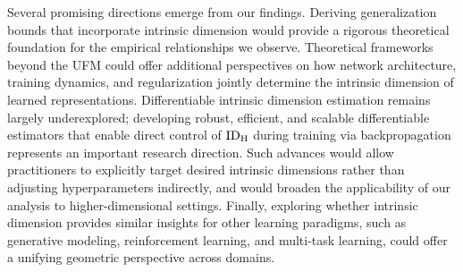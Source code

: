 Several promising directions emerge from our findings. Deriving generalization bounds that incorporate intrinsic dimension would provide a rigorous theoretical foundation for the empirical relationships we observe. Theoretical frameworks beyond the UFM could offer additional perspectives on how network architecture, training dynamics, and regularization jointly determine the intrinsic dimension of learned representations. Differentiable intrinsic dimension estimation remains largely underexplored; developing robust, efficient, and scalable differentiable estimators that enable direct control of $\mathrm{ID}_{\mathrm{H}}$ during training via backpropagation represents an important research direction. Such advances would allow practitioners to explicitly target desired intrinsic dimensions rather than adjusting hyperparameters indirectly, and would broaden the applicability of our analysis to higher-dimensional settings. Finally, exploring whether intrinsic dimension provides similar insights for other learning paradigms, such as generative modeling, reinforcement learning, and multi-task learning, could offer a unifying geometric perspective across domains.